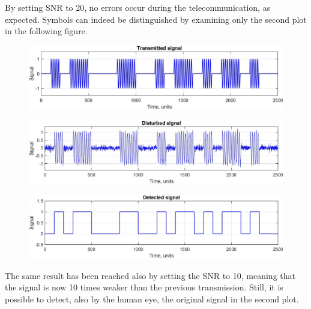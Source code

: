 By setting SNR to 20, no errors occur during the telecommunication, as expected. Symbols can indeed be distinguished by examining only the second plot in the following figure. 

\begin{figure}[h!]
    \centering
    \includegraphics[width = .85\textwidth]{lab-2/imgs/task8.1_Transmitted.jpg}
\end{figure}
\vspace{-15px}
\begin{figure}[h!]
    \centering
    \includegraphics[width = .85\textwidth]{lab-2/imgs/task8.1_Noise.jpg}
\end{figure}
\vspace{-15px}
\begin{figure}[h!]
    \centering
    \includegraphics[width = .85\textwidth]{lab-2/imgs/task8.1_Detected.jpg}
\end{figure}

\FloatBarrier\noindent The same result has been reached also by setting the SNR to 10, meaning that the signal is now 10 times weaker than the previous transmission. Still, it is possible to detect, also by the human eye, the original signal in the second plot.

